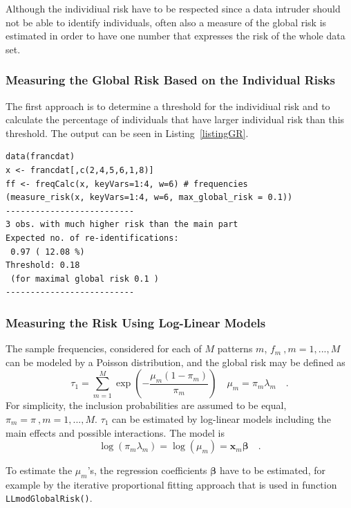 \documentclass[12pt]{article}
\begin{document}
Although the individiual risk have to be respected since a data intruder 
should not be able to identify individuals, 
often also a measure of the global risk is estimated in order to have one number 
that expresses the 
risk of the whole data set.


\subsubsection{Measuring the Global Risk Based on the Individual Risks}

The first approach is to determine a threshold for the individiual risk and to calculate 
the percentage of individuals that have larger individual risk than this threshold.
The output can be seen in Listing~\ref{listingGR}.

\begin{lstlisting}[captionpos=b, caption={Estimating the global risk.}, label=listingGR]
data(francdat)
x <- francdat[,c(2,4,5,6,1,8)]
ff <- freqCalc(x, keyVars=1:4, w=6) # frequencies
(measure_risk(x, keyVars=1:4, w=6, max_global_risk = 0.1))
--------------------------
3 obs. with much higher risk than the main part
Expected no. of re-identifications:
 0.97 ( 12.08 %)
Threshold: 0.18 
 (for maximal global risk 0.1 )
--------------------------
\end{lstlisting}


\subsubsection{Measuring the Risk Using Log-Linear Models}

The sample frequencies, considered for each of $M$ patterns $m$, $f_m \ , m=1,...,M$ 
can be modeled by a 
Poisson distribution, and the global risk may be defined as \citep[see][]{Skinner98}
\begin{equation}
\tau_1 = \sum\limits_{m=1}^{M} \exp\left( -\frac{\mu_m (1 - \pi_m)}{\pi_m}\right)  \quad \mu_m=\pi_m \lambda_m \quad .
\end{equation}
For simplicity, the inclusion probabilities are assumed to be equal, $\pi_m=\pi \ , m=1,...,M$.
$\tau_1$ can be estimated by log-linear models including the main effects and possible interactions.
The model is
\begin{displaymath}
\log (\pi_m \lambda_m) = \log (\mu_m) = \mathbf{x}_m \mathbf{\beta} \quad .
\end{displaymath}

To estimate the $\mu_m$'s, the regression coefficients $\mathbf{\beta}$ have to be estimated, for
example by the iterative proportional fitting approach that is used  
in function \lstinline{LLmodGlobalRisk()}.
\end{document}
